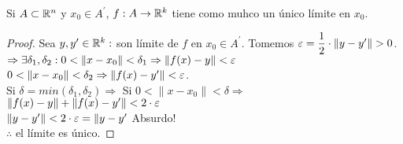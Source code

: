 \begin{lemma}
  Si $A \subset \mathbb{R}^n$ y $x_0 \in A^{\prime}$, $f: A \to \mathbb{R}^k$ tiene como muhco un único límite en $x_0$.
  \begin{proof}
    Sea $y, y^{\prime} \in \mathbb{R}^k : $ son límite de $f$ en $x_0 \in A^{\prime}$. Tomemos $\varepsilon = \dfrac{1}{2} \cdot \|y - y^{\prime}\| > 0$. \\
    $\Rightarrow \exists \delta_1, \delta_2 : 0 < \| x - x_0 \| < \delta_1 \Rightarrow \|f(x) - y \| < \varepsilon$ \\
    $0 < \|x - x_0\| < \delta_2 \Rightarrow \|f(x) - y^{\prime}\| < \varepsilon$. \\
    Si $\delta = min(\delta_1, \delta_2) \Rightarrow$ Si $0 < \|x - x_0\| < \delta \Rightarrow$ \\
    $\|f(x) - y\| + \|f(x) - y^{\prime}\| < 2 \cdot \varepsilon$ \\
    $\|y - y^{\prime}\| < 2 \cdot \varepsilon = \|y - y^{\prime}$ Absurdo! \\
    $\therefore$ el límite es único.
  \end{proof}
\end{lemma}

